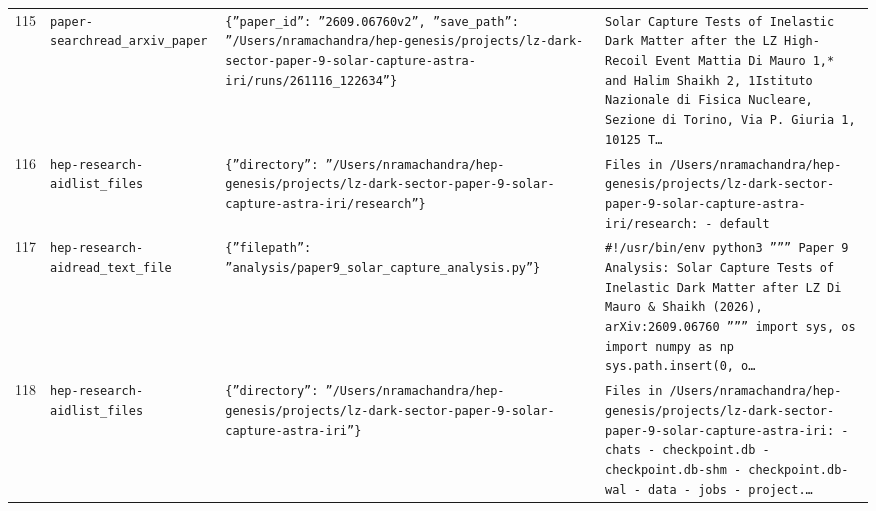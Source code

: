 \documentclass[11pt,a4paper]{article}
\begin{document}
\begin{longtable}{@{}p{}p{}p{}p{}@{}}
115 & \texttt{paper-search}\newline\texttt{read\_\allowbreak{}arxiv\_\allowbreak{}paper} & \texttt{\{''paper\_\allowbreak{}id'':\allowbreak{} ''2609.06760v2'',\allowbreak{} ''save\_\allowbreak{}path'':\allowbreak{} ''/\allowbreak{}Users/\allowbreak{}nramachandra/\allowbreak{}hep-genesis/\allowbreak{}projects/\allowbreak{}lz-dark-sector-paper-9-solar-capture-astra-iri/\allowbreak{}runs/\allowbreak{}261116\_\allowbreak{}122634''\}\allowbreak{}} & \texttt{Solar Capture Tests of Inelastic Dark Matter after the LZ High-Recoil Event Mattia Di Mauro 1,\allowbreak{}* and Halim Shaikh 2,\allowbreak{}\dag{}\allowbreak{} 1Istituto Nazionale di Fisica Nucleare,\allowbreak{} Sezione di Torino,\allowbreak{} Via P. Giuria 1,\allowbreak{} 10125 T\ldots{}\allowbreak{}} \\
116 & \texttt{hep-research-aid}\newline\texttt{list\_\allowbreak{}files} & \texttt{\{''directory'':\allowbreak{} ''/\allowbreak{}Users/\allowbreak{}nramachandra/\allowbreak{}hep-genesis/\allowbreak{}projects/\allowbreak{}lz-dark-sector-paper-9-solar-capture-astra-iri/\allowbreak{}research''\}\allowbreak{}} & \texttt{Files in /\allowbreak{}Users/\allowbreak{}nramachandra/\allowbreak{}hep-genesis/\allowbreak{}projects/\allowbreak{}lz-dark-sector-paper-9-solar-capture-astra-iri/\allowbreak{}research:\allowbreak{}   - default} \\
117 & \texttt{hep-research-aid}\newline\texttt{read\_\allowbreak{}text\_\allowbreak{}file} & \texttt{\{''filepath'':\allowbreak{} ''analysis/\allowbreak{}paper9\_\allowbreak{}solar\_\allowbreak{}capture\_\allowbreak{}analysis.py''\}\allowbreak{}} & \texttt{\#!/\allowbreak{}usr/\allowbreak{}bin/\allowbreak{}env python3 '''''' Paper 9 Analysis:\allowbreak{} Solar Capture Tests of Inelastic Dark Matter after LZ Di Mauro \& Shaikh (2026)\allowbreak{},\allowbreak{} arXiv:\allowbreak{}2609.06760 '''''' import sys,\allowbreak{} os import numpy as np sys.path.insert(0,\allowbreak{} o\ldots{}\allowbreak{}} \\
118 & \texttt{hep-research-aid}\newline\texttt{list\_\allowbreak{}files} & \texttt{\{''directory'':\allowbreak{} ''/\allowbreak{}Users/\allowbreak{}nramachandra/\allowbreak{}hep-genesis/\allowbreak{}projects/\allowbreak{}lz-dark-sector-paper-9-solar-capture-astra-iri''\}\allowbreak{}} & \texttt{Files in /\allowbreak{}Users/\allowbreak{}nramachandra/\allowbreak{}hep-genesis/\allowbreak{}projects/\allowbreak{}lz-dark-sector-paper-9-solar-capture-astra-iri:\allowbreak{}   - chats   - checkpoint.db   - checkpoint.db-shm   - checkpoint.db-wal   - data   - jobs   - project.\ldots{}\allowbreak{}} \\

\end{longtable}
\end{document}

